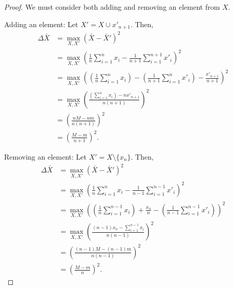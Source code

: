 \documentclass[11pt]{scrartcl} %
\begin{document}
\begin{proof}
	We must consider both adding and removing an element from $X$. \newline

	Adding an element: \newline
	Let $X' = X \cup x'_{n+1}$. Then,
	\begin{align*}
		\Delta \bar{X} &= \max_{X,X'} (\bar{X} - \bar{X}')^2 \\
					   &= \max_{X,X'} \left( \frac{1}{n}\sum_{i=1}^{n}x_i - \frac{1}{n+1}\sum_{i=1}^{n+1}x'_i \right)^2 \\
					   &= \max_{X,X'} \left( \left(\frac{1}{n}\sum_{i=1}^{n}x_i\right) - \left(\frac{1}{n+1}\sum_{i=1}^{n}x'_i\right) - \frac{x'_{n+1}}{n+1} \right)^2 \\
					   &= \max_{X,X'} \left( \frac{ \left(\sum_{i=1}^{n}x_i\right) - nx'_{n+1} }{n(n+1)} \right)^2 \\
					   &= \left( \frac{nM - nm}{n(n+1)} \right)^2 \\
					   &= \left( \frac{M - m}{n+1} \right)^2.
	\end{align*}

	Removing an element: \newline
	Let $X' = X \setminus \{ x_{n} \}$. Then,
	\begin{align*}
		\Delta \bar{X} &= \max_{X,X'} (\bar{X} - \bar{X}')^2 \\
					   &= \max_{X,X'} \left( \frac{1}{n}\sum_{i=1}^{n}x_i - \frac{1}{n-1}\sum_{i=1}^{n-1}x'_i \right)^2 \\
					   &= \max_{X,X'} \left( \left( \frac{1}{n}\sum_{i=1}^{n-1}x_i \right) + \frac{x_n}{n} - \left( \frac{1}{n-1}\sum_{i=1}^{n-1}x'_i \right) \right)^2 \\
					   &= \max_{X,X'} \left( \frac{(n-1)x_n - \sum_{i=1}^{n-1}x_i }{n(n-1)} \right)^2 \\
					   &= \left( \frac{(n-1)M - (n-1)m}{n(n-1)} \right)^2 \\
					   &= \left( \frac{M-m}{n} \right)^2.
	\end{align*}
\end{proof}

% 
% 
\end{document}
